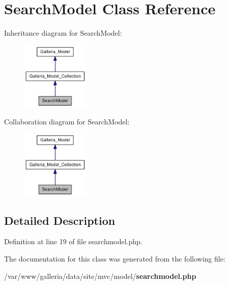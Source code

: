 \section{SearchModel Class Reference}
\label{classSearchModel}
Inheritance diagram for SearchModel:\nopagebreak
\begin{figure}[H]
\begin{center}
\leavevmode
\includegraphics[width=91pt]{classSearchModel__inherit__graph}
\end{center}
\end{figure}
Collaboration diagram for SearchModel:\nopagebreak
\begin{figure}[H]
\begin{center}
\leavevmode
\includegraphics[width=91pt]{classSearchModel__coll__graph}
\end{center}
\end{figure}


\subsection{Detailed Description}


Definition at line 19 of file searchmodel.php.

The documentation for this class was generated from the following file:\begin{CompactItemize}
\item 
/var/www/galleria/data/site/mvc/model/{\bf searchmodel.php}\end{CompactItemize}
